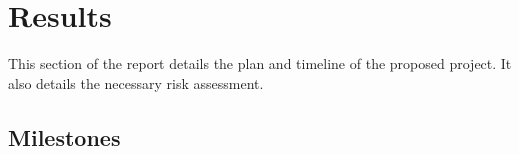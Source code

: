 
\chapter[Results]{Results}
\label{Chap:label}	%
\pagestyle{headings}



This section of the report details the plan and timeline of the proposed project. It also details the necessary risk assessment.


\section{Milestones}
\label{Sec:label}	%


